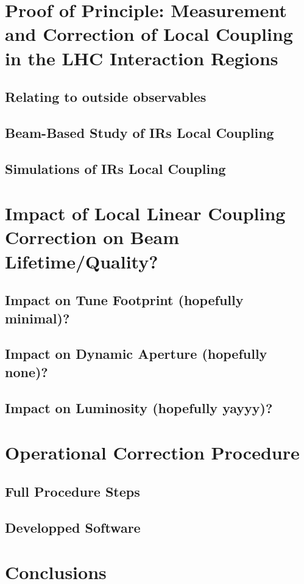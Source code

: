 \section{Proof of Principle: Measurement and Correction of Local Coupling in the LHC Interaction Regions}

\subsection{Relating to outside observables}

\subsection{Beam-Based Study of IRs Local Coupling}

\subsection{Simulations of IRs Local Coupling}


\section{Impact of Local Linear Coupling Correction on Beam Lifetime/Quality?}

\subsection{Impact on Tune Footprint (hopefully minimal)?}

\subsection{Impact on Dynamic Aperture (hopefully none)?}

\subsection{Impact on Luminosity (hopefully yayyy)?}


\section{Operational Correction Procedure}

\subsection{Full Procedure Steps}

\subsection{Developped Software}


\section{Conclusions}

